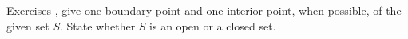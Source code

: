 {\noindent Exercises}
{, give one boundary point and one interior point, when possible, of the given set $S$. State whether $S$ is an open or a closed set.}

